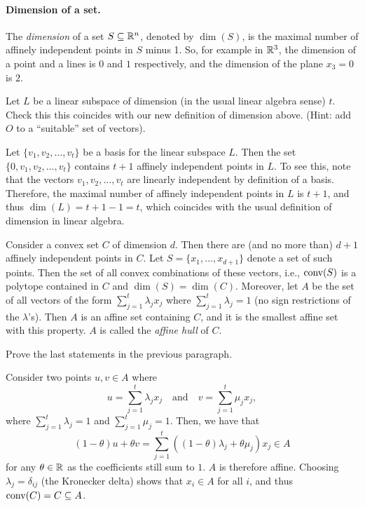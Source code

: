\paragraph{Dimension of a set.}
The \emph{dimension} of a set $S \subseteq \mathbb{R}^n$, denoted by $\dim(S)$, is the maximal number of affinely independent points in $S$ minus 1.
So, for example in $\mathbb{R}^3$, the dimension of a point and a lines is $0$ and $1$ respectively, and the dimension of the plane $x_3 = 0$ is $2$.

\begin{exercise}
  Let $L$ be a linear subspace of dimension (in the usual linear algebra sense) $t$.
  Check this this coincides with our new definition of dimension above.
  (Hint: add $O$ to a ``suitable'' set of vectors).
\end{exercise}

\begin{solution}
  Let $\{v_1, v_2, \ldots, v_t\}$ be a basis for the linear subspace $L$.
  Then the set $\{0, v_1, v_2, \ldots, v_t\}$ contains $t + 1$ affinely independent points in $L$.
  To see this, note that the vectors $v_1, v_2, \ldots, v_t$ are linearly independent by definition of a basis.
  Therefore, the maximal number of affinely independent points in $L$ is $t + 1$, and thus $\dim(L) = t + 1 - 1 = t$, which coincides with the usual definition of dimension in linear algebra.
\end{solution}

\begin{exercise}
  Consider a convex set $C$ of dimension $d$.
  Then there are (and no more than) $d + 1$ affinely independent points in $C$.
  Let $S = \{ x_1, \ldots, x_{d+1} \}$ denote a set of such points.
  Then the set of all convex combinations of these vectors, i.e., $\operatorname*{conv}(S)$ is a polytope contained in $C$ and $\dim(S) = \dim(C)$.
  Moreover, let $A$ be the set of all vectors of the form $\sum_{j = 1}^{t}\lambda_j x_j$ where $\sum_{j = 1}^{t} \lambda_j = 1$ (no sign restrictions of the $\lambda$'s).
  Then $A$ is an affine set containing $C$, and it is the smallest affine set with this property.
  $A$ is called the \emph{affine hull} of $C$.

  Prove the last statements in the previous paragraph.
\end{exercise}

\begin{solution}
  Consider two points $u, v \in A$ where
  \begin{equation}
    u = \sum_{j = 1}^{t} \lambda_j x_j
    \quad\text{and}\quad
    v = \sum_{j = 1}^{t} \mu_j x_j,
  \end{equation}
  where $\sum_{j = 1}^{t} \lambda_j = 1$ and $\sum_{j = 1}^{t} \mu_j = 1$.
  Then, we have that
  \begin{equation}
    (1 - \theta)u + \theta v
    = \sum_{j = 1}^{t} ((1 - \theta) \lambda_j + \theta \mu_j) x_j \in A
  \end{equation}
  for any $\theta \in \mathbb{R}$ as the coefficients still sum to $1$.
  $A$ is therefore affine.
  Choosing $\lambda_j = \delta_{ij}$ (the Kronecker delta) shows that $x_i \in A$ for all $i$, and thus $\operatorname*{conv}(C) = C \subseteq A$.
\end{solution}

